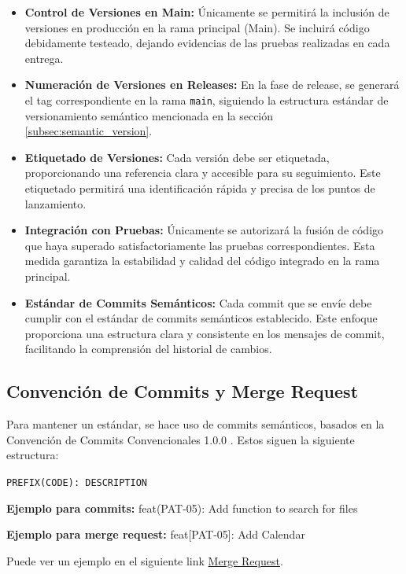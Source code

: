 \begin{itemize}
\item \textbf{Control de Versiones en Main:} Únicamente se permitirá la inclusión de versiones en producción en la rama principal (Main).
Se incluirá código debidamente testeado, dejando evidencias de las pruebas realizadas en cada entrega.

\item \textbf{Numeración de Versiones en Releases:} En la fase de release, se generará el tag correspondiente en la rama \texttt{main}, siguiendo la estructura estándar de versionamiento semántico mencionada en la sección \ref{subsec:semantic_version}.

\item \textbf{Etiquetado de Versiones:} Cada versión debe ser etiquetada, proporcionando una referencia clara y accesible para su seguimiento. Este etiquetado permitirá una identificación rápida y precisa de los puntos de lanzamiento.

\item \textbf{Integración con Pruebas:} Únicamente se autorizará la fusión de código que haya superado satisfactoriamente las pruebas correspondientes. Esta medida garantiza la estabilidad y calidad del código integrado en la rama principal.

\item \textbf{Estándar de Commits Semánticos:} Cada commit que se envíe debe cumplir con el estándar de commits semánticos establecido. Este enfoque proporciona una estructura clara y consistente en los mensajes de commit, facilitando la comprensión del historial de cambios.

\end{itemize}


\subsection{Convención de Commits y Merge Request}

Para mantener un estándar, se hace uso de commits semánticos, basados en la Convención de Commits Convencionales 1.0.0 \cite{conventional_commits}. Estos siguen la siguiente estructura:

\texttt{PREFIX(CODE): DESCRIPTION}

\textbf{Ejemplo para commits:}
feat(PAT-05): Add function to search for files

\textbf{Ejemplo para merge request:}
feat[PAT-05]: Add Calendar

Puede ver un ejemplo en el siguiente link \href{https://github.com/proyecto-patrocinio/proyecto-patrocinio/pull/100}{Merge Request}.

